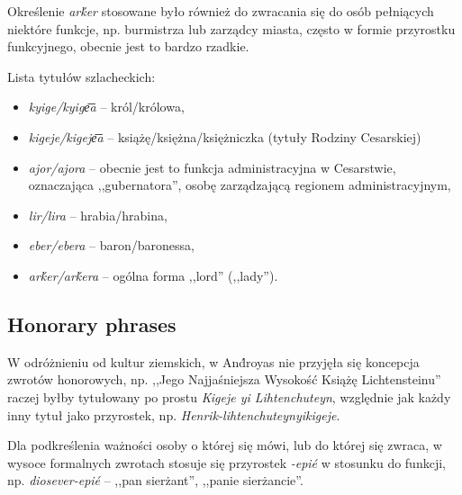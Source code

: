 

Określenie \emph{arḱer} stosowane było również do zwracania się do osób
pełniących niektóre funkcje, np. burmistrza lub zarządcy miasta, często w formie
przyrostku funkcyjnego, obecnie jest to bardzo rzadkie.

Lista tytułów szlacheckich:

\begin{itemize}
    \item \emph{kyige/kyige͞a} -- król/królowa,
    \item \emph{kigeje/kigeje͞a} -- książę/księżna/księżniczka (tytuły Rodziny
          Cesarskiej)
    \item \emph{ajor/ajora} -- obecnie jest to funkcja administracyjna w
          Cesarstwie, oznaczająca ,,gubernatora'', osobę zarządzającą regionem
          administracyjnym,
    \item \emph{lir/lira} -- hrabia/hrabina,
    \item \emph{eber/ebera} -- baron/baronessa,
    \item \emph{arḱer/arḱera} -- ogólna forma ,,lord'' (,,lady'').
\end{itemize}

\subsection{Honorary phrases}

W odróżnieniu od kultur ziemskich, w And́royas nie przyjęła się koncepcja
zwrotów honorowych, np. ,,Jego Najjaśniejsza Wysokość Książę Lichtensteinu''
raczej byłby tytułowany po prostu \emph{Kigeje yi Lihtenchuteyn}, względnie jak
każdy inny tytuł jako przyrostek, np. \emph{Henrik-lihtenchuteynyikigeje}.

Dla podkreślenia ważności osoby o której się mówi, lub do której się zwraca, w
wysoce formalnych zwrotach stosuje się przyrostek \emph{-epié} w stosunku do
funkcji, np. \emph{diosever-epié} -- ,,pan sierżant'', ,,panie sierżancie''.


